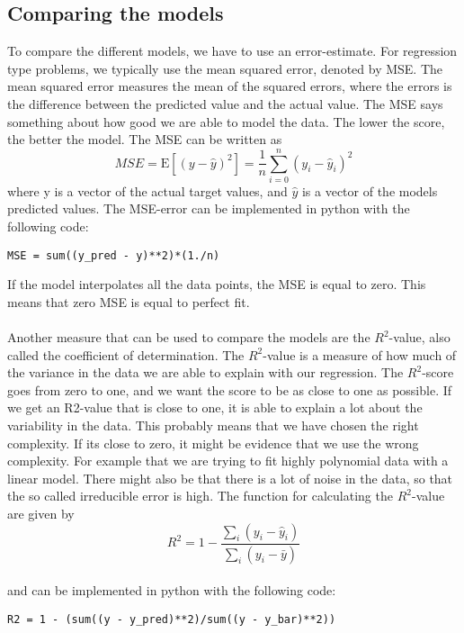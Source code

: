 \subsection{Comparing the models}
To compare the different models, we have to use an error-estimate. For regression type problems, we typically use the mean squared error, denoted by MSE.\cite{hastie} The mean squared error measures the mean of the squared errors, where the errors is the difference between the predicted value and the actual value. The MSE says something about how good we are able to model the data. The lower the score, the better the model. The MSE can be written as 
\begin{equation}
    MSE = \text{E}[(y - \hat{y})^2] = \frac{1}{n}\sum_{i=0}^n(y_i - \hat{y}_i)^2
\end{equation}
where y is a vector of the actual target values, and $\hat{y}$ is a vector of the models predicted values. The MSE-error can be implemented in python with the following code: 
\begin{lstlisting}
MSE = sum((y_pred - y)**2)*(1./n)
\end{lstlisting}
If the model interpolates all the data points, the MSE is equal to zero. This means that zero MSE is equal to perfect fit. 
\\
\\
Another measure that can be used to compare the models are the $R^2$-value, also called the coefficient of determination. The $R^2$-value is a measure of how much of the variance in the data we are able to explain with our regression.\cite{hastie} The $R^2$-score goes from zero to one, and we want the score to be as close to one as possible. If we get an R2-value that is close to one, it is able to explain a lot about the variability in the data. This probably means that we have chosen the right complexity. If its close to zero, it might be evidence that we use the wrong complexity. For example that we are trying to fit  highly polynomial data with a linear model. There might also be that there is a lot of noise in the data, so that the so called irreducible error is high. The function for calculating the $R^2$-value are given by
\begin{equation}
    R^2 = 1 - \frac{\sum_i(y_i - \hat{y}_i)}{\sum_i(y_i - \bar{y})}
\end{equation}
\\
and can be implemented in python with the following code:
\begin{lstlisting}
R2 = 1 - (sum((y - y_pred)**2)/sum((y - y_bar)**2))
\end{lstlisting}
